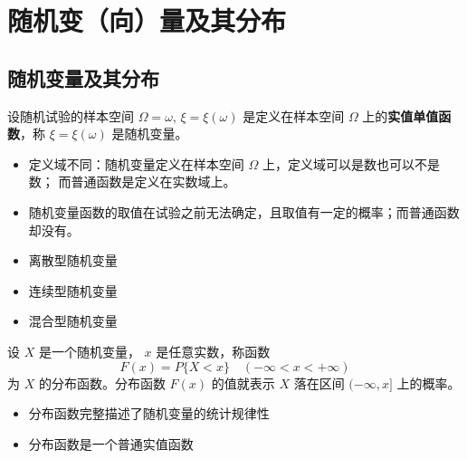 \section{随机变（向）量及其分布}

\subsection{随机变量及其分布}

 设随机试验的样本空间  $ \Omega = {\omega} $, $ \xi = \xi(\omega) $
是定义在样本空间 $ \Omega $ 上的\textbf{实值单值函数}，称 $ \xi = \xi(\omega) $ 是随机变量。

\begin{itemize}[leftmargin=\subparitemindent]
    \item 定义域不同：随机变量定义在样本空间 $ \Omega $ 上，定义域可以是数也可以不是数；
    而普通函数是定义在实数域上。
    \item 随机变量函数的取值在试验之前无法确定，且取值有一定的概率；而普通函数却没有。
\end{itemize}

\begin{itemize}[leftmargin=\subparitemindent]
    \item 离散型随机变量
    \item 连续型随机变量
    \item 混合型随机变量
\end{itemize}

 设 $ X $ 是一个随机变量， $ x $ 是任意实数，称函数 \begin{equation}
    \label{equ:分布函数定义}
    F(x) = P\{X < x\} \quad (-\infty < x < +\infty)
\end{equation}
为 $ X $ 的分布函数。分布函数 $ F(x) $ 的值就表示 $ X $ 落在区间 $ (-\infty,x] $ 上的概率。

\begin{itemize}[leftmargin=\subparitemindent]
    \item 分布函数完整描述了随机变量的统计规律性
    \item 分布函数是一个普通实值函数 
\end{itemize}

